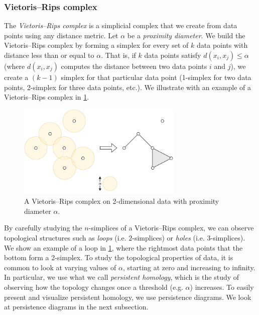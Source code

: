 \subsubsection{Vietoris–Rips complex}
\label{sec:vietoris-rips-complex}
The \textit{Vietoris–Rips complex} is a simplicial complex that we create from data points using any distance metric. Let $\alpha$ be a \textit{proximity diameter}. We build the Vietoris–Rips complex by forming a simplex for every set of $k$ data points with distance less than or equal to $\alpha$. That is, if $k$ data points satisfy $d(x_i, x_j) \leq \alpha$ (where $d(x_i, x_j)$ computes the distance between two data points $i$ and $j$), we create a $(k-1)$ simplex for that particular data point (1-simplex for two data points, 2-simplex for three data points, etc.). We illustrate with an example of a Vietoris–Rips complex in \cref{fig:simplicial-complex-rips}.
\begin{figure}[H]
    \centering
    \includegraphics[width=0.7\textwidth]{thesis/figures/simplicial-complex-rips_cropped.pdf}
    \caption{A Vietoris–Rips complex on 2-dimensional data with proximity diameter $\alpha$.}
    \label{fig:simplicial-complex-rips}
\end{figure}
By carefully studying the $n$-simplices of a Vietoris–Rips complex, we can observe topological structures such as \textit{loops} (i.e. $2$-simplices) or \textit{holes}  (i.e. $3$-simplices). We show an example of a loop in \cref{fig:simplicial-complex-rips}, where the rightmost data points that the bottom form a 2-simplex. To study the topological properties of data, it is common to look at varying values of $\alpha$, starting at zero and increasing to infinity. In particular, we use what we call \textit{persistent homology}, which is the study of observing how the topology changes once a threshold (e.g. $\alpha$) increases. To easily present and visualize persistent homology, we use persistence diagrams. We look at persistence diagrams in the next subsection.

